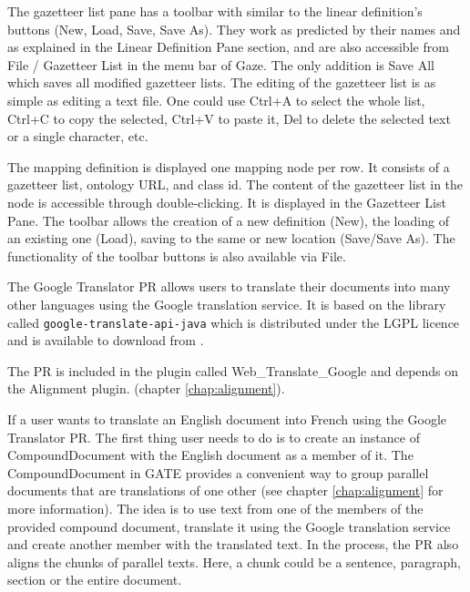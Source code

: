 The gazetteer list pane has a toolbar with similar to the linear definition's
buttons (New, Load, Save, Save As). They work as predicted by their names and as
explained in the Linear Definition Pane section, and are also accessible from
File / Gazetteer List in the menu bar of Gaze. The only addition is Save All
which saves all modified gazetteer lists. The editing of the gazetteer list is
as simple as editing a text file. One could use Ctrl+A to select the whole list,
Ctrl+C to copy the selected, Ctrl+V to paste it, Del to delete the selected text
or a single character, etc.
	

The mapping definition is displayed one mapping node per row. It consists of a
gazetteer list, ontology URL, and class id. The content of the gazetteer list in
the node is accessible through double-clicking. It is displayed in the Gazetteer
List Pane. The toolbar allows the creation of a new definition (New), the
loading of an existing one (Load), saving to the same or new location (Save/Save
As). The functionality of the toolbar buttons is also available via File.


The Google Translator PR allows users to translate their documents into many 
other languages using the Google translation service. It is based on the library
called {\tt google-translate-api-java} which is distributed under the LGPL 
licence and is available to download from 
.

The PR is included in the plugin called Web\_Translate\_Google and depends on 
the Alignment plugin. (chapter \ref{chap:alignment}).

If a user wants to translate an English document into French using the Google 
Translator PR. The first thing user needs to do is to create an instance of 
CompoundDocument with the English document as a member of it.  The 
CompoundDocument in GATE provides a convenient way to group parallel documents 
that are translations of one other (see chapter \ref{chap:alignment} for more
information).  The idea is to use text from one of the members of the provided 
compound document, translate it using the Google translation service and create
another member with the translated text.  In the process, the PR also aligns the
chunks of parallel texts.  Here, a chunk could be a sentence, paragraph, section
or the entire document.

